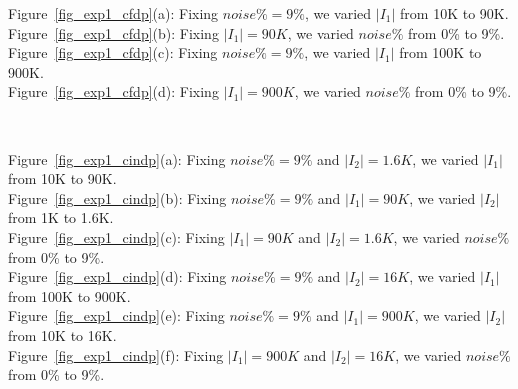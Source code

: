 \noindent Figure~\ref{fig_exp1_cfdp}(a): Fixing $noise\% = 9\%$, we varied $|I_1|$ from 10K to 90K.    \\
Figure~\ref{fig_exp1_cfdp}(b): Fixing $|I_1|=90K$, we varied $noise\%$ from 0\% to 9\%.\\
Figure~\ref{fig_exp1_cfdp}(c): Fixing $noise\% = 9\%$, we varied $|I_1|$ from 100K to 900K.  \\
Figure~\ref{fig_exp1_cfdp}(d): Fixing $|I_1|=900K$, we varied $noise\%$ from 0\% to 9\%.  \\


\begin{figure*}
  \centering
  \quad
  \quad
  \quad \\
  \quad
  \quad
  \caption{Efficiency of detecting \pCIND violations}\label{fig_exp1_cindp}
\end{figure*}

\noindent Figure~\ref{fig_exp1_cindp}(a): Fixing $noise\% = 9\%$ and $|I_2| = 1.6K$, we varied $|I_1|$ from 10K to 90K. \\
Figure~\ref{fig_exp1_cindp}(b): Fixing $noise\% = 9\%$ and $|I_1| = 90K$, we varied $|I_2|$ from 1K to 1.6K.\\
Figure~\ref{fig_exp1_cindp}(c): Fixing $|I_1| = 90K$ and $|I_2| = 1.6K$, we varied $noise\%$ from 0\% to 9\%.\\
Figure~\ref{fig_exp1_cindp}(d): Fixing $noise\% = 9\%$ and $|I_2| = 16K$, we varied $|I_1|$ from 100K to 900K.\\
Figure~\ref{fig_exp1_cindp}(e): Fixing $noise\% = 9\%$ and $|I_1| = 900K$, we varied $|I_2|$ from 10K to 16K.\\
Figure~\ref{fig_exp1_cindp}(f): Fixing $|I_1| = 900K$ and $|I_2| = 16K$, we varied $noise\%$ from 0\% to 9\%.\\


\begin{figure*}
  \centering
  \quad
  \quad
  \quad \\
  \quad
  \quad

  \caption{Efficiency of detecting \pCFD and \pCIND violations}\label{fig_exp1_both}
\end{figure*}


